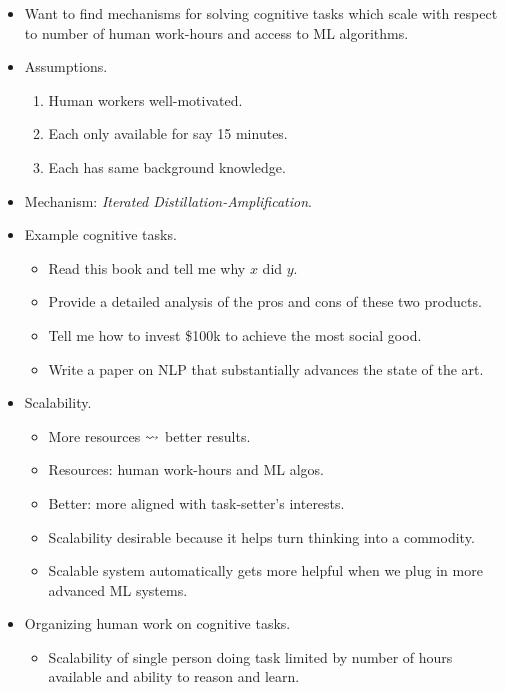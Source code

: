 \begin{itemize}
    \item Want to find mechanisms for solving cognitive tasks which scale with respect to number of human work-hours and access to ML algorithms.
    \item Assumptions.
    \begin{enumerate}[label=(\arabic*)]
        \item\label{item:well-motivated; assumptions; factored cognition} Human workers well-motivated.
        \item\label{item:limited time; assumptions; factored cognition} Each only available for say 15 minutes.
        \item\label{item:same background; assumptions; factored cognition} Each has same background knowledge.
    \end{enumerate}
    \item Mechanism: \emph{Iterated Distillation-Amplification}.
    \item Example cognitive tasks.
    \begin{itemize}
        \item Read this book and tell me why $x$ did $y$.
        \item Provide a detailed analysis of the pros and cons of these two products.
        \item Tell me how to invest \$100k to achieve the most social good.
        \item Write a paper on NLP that substantially advances the state of the art.
    \end{itemize}
    \item Scalability.
    \begin{itemize}
        \item More resources $\rightsquigarrow$ better results.
        \item Resources: human work-hours and ML algos.
        \item Better: more aligned with task-setter's interests.
        \item Scalability desirable because it helps turn thinking into a commodity.
        \item Scalable system automatically gets more helpful when we plug in more advanced ML systems.
    \end{itemize}
    \item Organizing human work on cognitive tasks.
    \begin{itemize}
        \item Scalability of single person doing task limited by number of hours available and ability to reason and learn.

\end{itemize}
\end{itemize}
